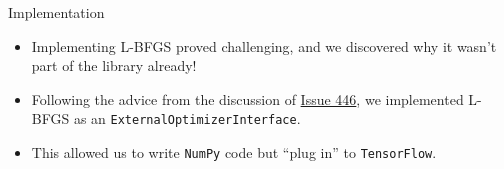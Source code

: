 \documentclass[draft]{beamer}
\begin{document}
\begin{frame}[t]{Implementation}
  \begin{itemize}
    \item Implementing L-BFGS proved challenging, and we discovered why it wasn't
      part of the library already!
    \item Following the advice from the discussion of 
      \href{https://github.com/tensorflow/tensorflow/issues/446}{Issue 446}, we
      implemented L-BFGS as an \texttt{ExternalOptimizerInterface}.
    \item This allowed us to write \texttt{NumPy} code but ``plug in'' to
      \texttt{TensorFlow}.
  \end{itemize}
\end{frame}
\end{document}
